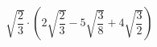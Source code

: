 \begin{ex}[type=expression]
	\begin{condition}
		\( \sqrt{\dfrac{2}{3}}\cdot\left( 2\sqrt{\dfrac{2}{3}}-5\sqrt{\dfrac{3}{8}}+4\sqrt{\dfrac{3}{2}} \right) \)
	\end{condition}
\end{ex}
